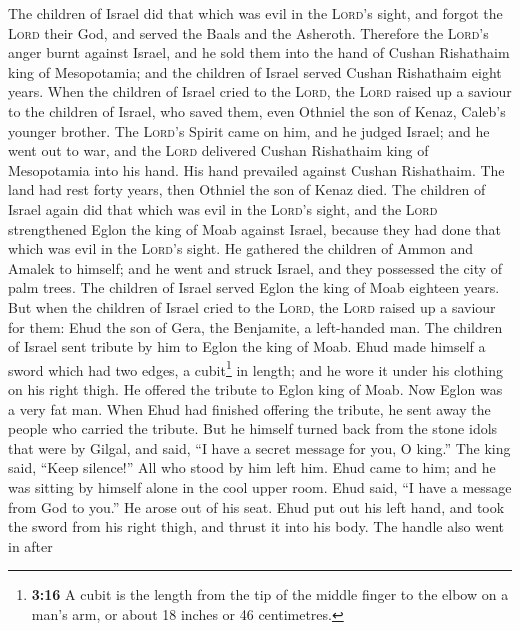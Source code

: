  The children of Israel did that which was evil in the
\textsc{Lord}'s sight, and forgot the \textsc{Lord} their God, and
served the Baals and the Asheroth.  Therefore the
\textsc{Lord}'s anger burnt against Israel, and he sold them into the
hand of Cushan Rishathaim king of Mesopotamia; and the children of
Israel served Cushan Rishathaim eight years.  When the
children of Israel cried to the \textsc{Lord}, the \textsc{Lord} raised
up a saviour to the children of Israel, who saved them, even Othniel the
son of Kenaz, Caleb's younger brother.  The
\textsc{Lord}'s Spirit came on him, and he judged Israel; and he went
out to war, and the \textsc{Lord} delivered Cushan Rishathaim king of
Mesopotamia into his hand. His hand prevailed against Cushan Rishathaim.
 The land had rest forty years, then Othniel the son of
Kenaz died.  The children of Israel again did that which
was evil in the \textsc{Lord}'s sight, and the \textsc{Lord}
strengthened Eglon the king of Moab against Israel, because they had
done that which was evil in the \textsc{Lord}'s sight. 
He gathered the children of Ammon and Amalek to himself; and he went and
struck Israel, and they possessed the city of palm trees.
 The children of Israel served Eglon the king of Moab
eighteen years.  But when the children of Israel cried to
the \textsc{Lord}, the \textsc{Lord} raised up a saviour for them: Ehud
the son of Gera, the Benjamite, a left-handed man. The children of
Israel sent tribute by him to Eglon the king of Moab. 
Ehud made himself a sword which had two edges, a cubit\footnote{\textbf{3:16}
  A cubit is the length from the tip of the middle finger to the elbow
  on a man's arm, or about 18 inches or 46 centimetres.} in length; and
he wore it under his clothing on his right thigh.  He
offered the tribute to Eglon king of Moab. Now Eglon was a very fat man.
 When Ehud had finished offering the tribute, he sent
away the people who carried the tribute.  But he himself
turned back from the stone idols that were by Gilgal, and said, ``I have
a secret message for you, O king.'' The king said, ``Keep silence!'' All
who stood by him left him.  Ehud came to him; and he was
sitting by himself alone in the cool upper room. Ehud said, ``I have a
message from God to you.'' He arose out of his seat. 
Ehud put out his left hand, and took the sword from his right thigh, and
thrust it into his body.  The handle also went in after
